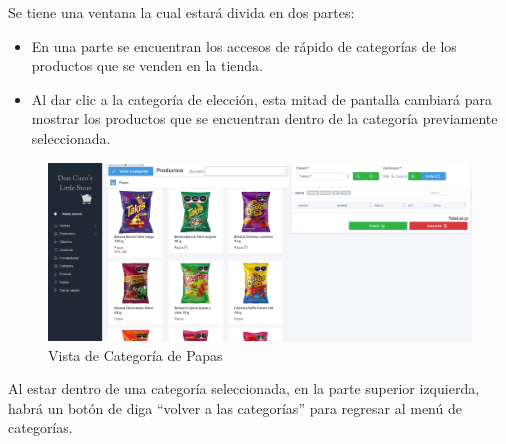 \documentclass[a4paper,DIV=12]{scrreprt}
\begin{document}
Se tiene una ventana la cual estará divida en dos partes:
\begin{itemize}


	\item En una parte se encuentran los accesos de rápido de categorías de los productos que se venden en la tienda. 
	\item Al dar clic a la categoría de elección, esta mitad de pantalla cambiará para mostrar los productos que se encuentran dentro de la categoría previamente seleccionada.
	\end{itemize}
	
	\clearpage
	
	\begin{figure}[!htb]
		\centering
		\includegraphics[scale=0.4]{VENTAS1.PNG}
		\caption{Vista de Categoría de Papas}
	\end{figure}
	
	Al estar dentro de una categoría seleccionada, en la parte superior izquierda, habrá un botón de diga “volver a las categorías” para regresar al menú de categorías.\\
	
\end{document}
